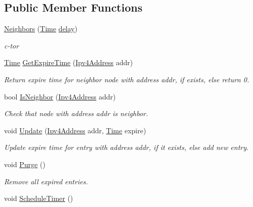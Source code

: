 \subsection*{Public Member Functions}
\begin{DoxyCompactItemize}
\item 
\hyperlink{classns3_1_1aodv_1_1Neighbors_a35ec5c1960e97af514f34c85d84e4abf}{Neighbors} (\hyperlink{classns3_1_1Time}{Time} \hyperlink{mmwave_2model_2fading-traces_2fading__trace__generator_8m_a7964e6aa8f61a9d28973c8267a606ad8}{delay})
\begin{DoxyCompactList}\small\item\em c-\/tor \end{DoxyCompactList}\item 
\hyperlink{classns3_1_1Time}{Time} \hyperlink{classns3_1_1aodv_1_1Neighbors_a08811b3c7cfcc0a152a05d2d582ea6eb}{Get\+Expire\+Time} (\hyperlink{classns3_1_1Ipv4Address}{Ipv4\+Address} addr)
\begin{DoxyCompactList}\small\item\em Return expire time for neighbor node with address addr, if exists, else return 0. \end{DoxyCompactList}\item 
bool \hyperlink{classns3_1_1aodv_1_1Neighbors_adec5bc2eea2791e166a37df5b9e05be2}{Is\+Neighbor} (\hyperlink{classns3_1_1Ipv4Address}{Ipv4\+Address} addr)
\begin{DoxyCompactList}\small\item\em Check that node with address addr is neighbor. \end{DoxyCompactList}\item 
void \hyperlink{classns3_1_1aodv_1_1Neighbors_a88577f05c06fbff8cf9ed281e9077f6e}{Update} (\hyperlink{classns3_1_1Ipv4Address}{Ipv4\+Address} addr, \hyperlink{classns3_1_1Time}{Time} expire)
\begin{DoxyCompactList}\small\item\em Update expire time for entry with address addr, if it exists, else add new entry. \end{DoxyCompactList}\item 
void \hyperlink{classns3_1_1aodv_1_1Neighbors_a5db1238b20a700967e21ebb3522afc5c}{Purge} ()
\begin{DoxyCompactList}\small\item\em Remove all expired entries. \end{DoxyCompactList}\item 
void \hyperlink{classns3_1_1aodv_1_1Neighbors_a2eff3f9bda1412b0539c709acf0538cc}{Schedule\+Timer} ()

\end{DoxyCompactItemize}
